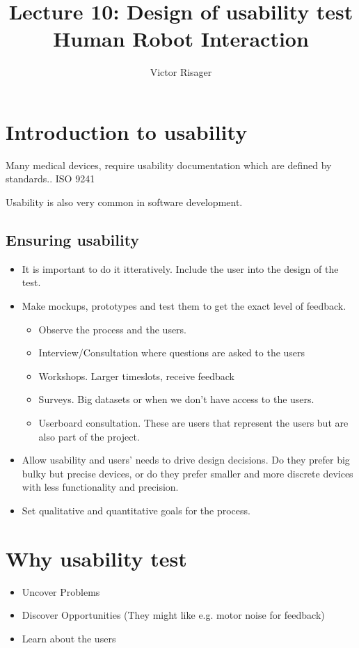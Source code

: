 \documentclass[a4paper]{article}
\title{Lecture 10: Design of usability test  \\
	\large Human Robot Interaction}
\author{Victor Risager}
\begin{document}
\maketitle

\section{Introduction to usability}

Many medical devices, require usability documentation which are defined by standards.. ISO 9241

Usability is also very common in software development.

\subsection{Ensuring usability}
\begin{itemize}
	\item It is important to do it itteratively. Include the user into the design of the test. 
	\item Make mockups, prototypes and test them to get the exact level of feedback.
		\begin{itemize}
			\item Observe the process and the users. 
			\item Interview/Consultation where questions are asked to the users
			\item Workshops. Larger timeslots, receive feedback
			\item Surveys. Big datasets or when we don't have access to the users. 
			\item Userboard consultation. These are users that represent the users but are also part of the project.
		\end{itemize}
	\item Allow usability and users' needs to drive design decisions. Do they prefer big bulky but precise devices, or do they prefer smaller and more discrete devices with less functionality and precision.
			\item Set qualitative and quantitative goals for the process.
\end{itemize}

\section{Why usability test}
\begin{itemize}
	\item Uncover Problems
	\item Discover Opportunities (They might like e.g. motor noise for feedback)
	\item Learn about the users
\end{itemize}
\end{document}
